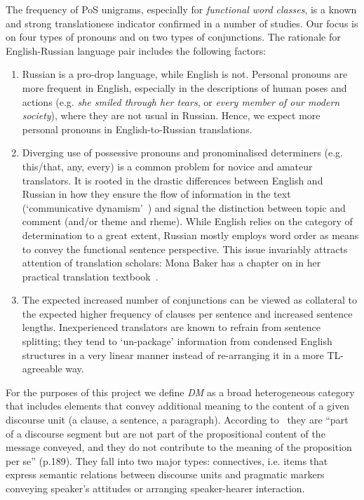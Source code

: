 The frequency of PoS unigrams, especially for \textit{functional word classes}, is a known and strong translationese indicator confirmed in a number of studies. Our focus is on four types of pronouns and on two types of conjunctions. 
The rationale for English-Russian language pair includes the following factors: 
\begin{enumerate}\compresslist{}
	\item Russian is a pro-drop language, while English is not. Personal pronouns are more frequent in English, especially in the descriptions of human poses and actions (e.g. \textit{she smiled through her tears}, or \textit{every member of our modern society}), where they are not usual in Russian. Hence, we expect more personal pronouns in English-to-Russian translations. 
	\item Diverging use of possessive pronouns and pronominalised determiners (e.g. this/that, any, every) is a common problem for novice and amateur translators. It is rooted in the drastic differences between English and Russian in how they ensure the flow of information in the text (`communicative dynamism'~\cite{Firbas1992}) and signal the distinction between topic and comment (and/or theme and rheme). While English relies on the category of determination to a great extent, Russian mostly employs word order as means to convey the functional sentence perspective. This issue invariably attracts attention of translation scholars: Mona Baker has a chapter on in her practical translation textbook~\cite{Baker2011}.
	\item The expected increased number of conjunctions can be viewed as collateral to the expected higher frequency of clauses per sentence and increased sentence lengths. Inexperienced translators are known to refrain from sentence splitting; they tend to `un-package' information from condensed English structures in a very linear manner instead of re-arranging it in a more TL-agreeable way.  
\end{enumerate}

For the purposes of this project we define \textit{\gls{DM}} as a broad heterogeneous category that includes elements that convey additional meaning to the content of a given discourse unit (a clause, a sentence, a paragraph). According to~\citet{Fraser2006} they are ``part of a discourse segment but are not part of the propositional content of the message conveyed, and they do not contribute to the meaning of the proposition per se'' (p.189). They fall into two major types: connectives, i.e. items that express semantic relations between discourse units and pragmatic markers conveying speaker's attitudes or arranging speaker-hearer interaction. 

